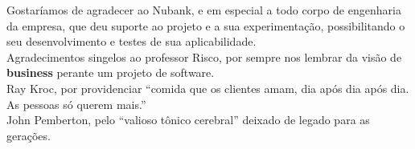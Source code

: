 \documentclass[twosideprint]{politex}
\begin{document}
\capa
\folhaderosto


\begin{folhadeaprovacao}
\end{folhadeaprovacao}






\begin{agradecimentos}
Gostaríamos de agradecer ao Nubank, e em especial a todo corpo de engenharia da empresa, que deu suporte ao projeto e a sua experimentação, possibilitando o seu desenvolvimento e testes de sua aplicabilidade.\\
\indent Agradecimentos singelos ao professor Risco, por sempre nos lembrar da visão de \textbf{business} perante um projeto de software.\\
\indent Ray Kroc, por providenciar ``comida que os clientes amam, dia após dia após dia. As pessoas só querem mais.''\\
\indent John Pemberton, pelo ``valioso tônico cerebral'' deixado de legado para as gerações.
\end{agradecimentos}









\listadefiguras
\listadetabelas



\sumario



\end{document}
